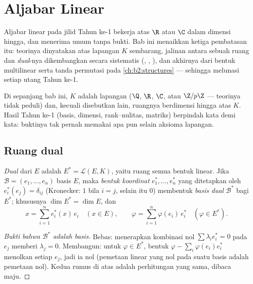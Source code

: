 \chapter{Aljabar Linear}\label{ch:b2:linalg}

Aljabar linear pada jilid Tahun ke-1 bekerja atas $\R$ atau $\C$ dalam
dimensi hingga, dan menerima  umum tanpa bukti. Bab ini
menaikkan ketiga pembatasan itu: teorinya dinyatakan atas lapangan
$K$ sembarang, jalinan antara sebuah ruang dan \emph{dual}-nya
dikembangkan secara sistematis (, , ), dan
 akhirnya \emph{} dari bentuk multilinear 
serta tanda permutasi pada
\cref{ch:b2:structures} --- sehingga melunasi setiap utang Tahun ke-1.

Di sepanjang bab ini, $K$ adalah lapangan ($\Q$, $\R$, $\C$, atau
$\Z/p\Z$ --- teorinya tidak peduli) dan, kecuali disebutkan lain, ruangnya
berdimensi hingga atas $K$. Hasil Tahun ke-1 (basis, dimensi,
rank--nulitas, matriks) berpindah kata demi kata: buktinya tak pernah
memakai apa pun selain aksioma lapangan.

\section{Ruang dual}

\begin{definition}\label{def:b2:linalg:dual}
\emph{Dual} dari $E$ adalah $E^* = \mathcal{L}(E,
K)$, yaitu ruang semua bentuk linear. Jika $\mathcal{B} = (e_1, \dots, e_n)$
basis $E$, maka \emph{bentuk koordinat} $e_1^*, \dots, e_n^*$
yang ditetapkan oleh $e_i^*(e_j) = \delta_{ij}$ (Kronecker: $1$ bila $i = j$,
selain itu $0$) membentuk \emph{basis dual}
$\mathcal{B}^*$ bagi $E^*$; khususnya $\dim E^* = \dim E$, dan
\[
x = \sum_{i=1}^{n} e_i^*(x)\, e_i \quad (x \in E),
\qquad
\varphi = \sum_{i=1}^{n} \varphi(e_i)\, e_i^* \quad (\varphi \in
E^*).
\]
\end{definition}

\begin{proof}[Bukti bahwa $\mathcal{B}^*$ adalah basis]
Bebas: menerapkan kombinasi nol $\sum \lambda_i e_i^* = 0$ pada
$e_j$ memberi $\lambda_j = 0$. Membangun: untuk $\varphi \in E^*$, bentuk
$\varphi - \sum_i \varphi(e_i) e_i^*$ menolkan setiap $e_j$, jadi
ia nol (pemetaan linear yang nol pada suatu basis adalah pemetaan nol). Kedua
rumus di atas adalah perhitungan yang sama, dibaca maju.
\end{proof}

